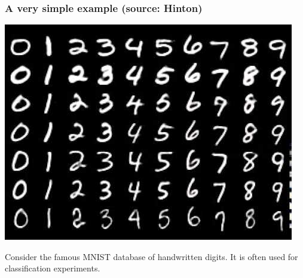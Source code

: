 \documentclass[xcolor=table]{beamer}
\begin{document}
\begin{mdframe}%

\frametitle{A very simple example (source: Hinton)}\label{heading-sec-a-very-simple-example-source--hinton}%

\noindent{}\includegraphics[keepaspectratio=true,width=\dimmin{}{\dimwidth{0.90}}]{images/mnist}{}%

\noindent{}Consider the famous MNIST database of handwritten digits. It is often used for classification experiments.%
\end{mdframe}\label{sec-a-very-simple-example-source--hinton}%
\end{document}
